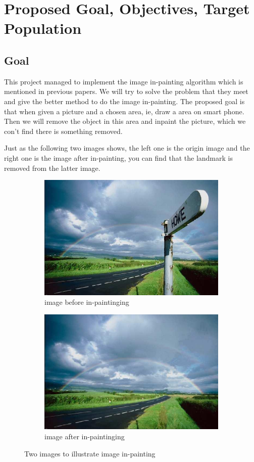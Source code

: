 \documentclass[12pt]{article}
\begin{document}
\section{Proposed Goal, Objectives, Target Population}
\subsection{Goal}
\qquad This project managed to implement the image in-painting algorithm which is mentioned in previous papers. We will try to solve the problem that they meet and give the better method to do the image in-painting. The proposed goal is that when given a picture and a chosen area, ie, draw a area on smart phone. Then we will remove the object in this area and inpaint the picture, which we con't find there is something removed.

\qquad Just as the following two images shows, the left one is the origin image and the right one is the image after in-painting, you can find that the landmark is removed from the latter image.

\begin{figure}[H]
	\begin{subfigure}[pos]{.5\textwidth}
		\centering
		\includegraphics*[width=0.8\linewidth]{1.jpg}
		\caption{image before in-paintinging}
	\end{subfigure}%
	\begin{subfigure}[pos]{.5\textwidth}
		\centering
		\includegraphics*[width=0.8\linewidth]{2.jpg}
		\caption{image after in-paintinging}
	\end{subfigure}%
	\caption{Two images to illustrate image in-painting}
\end{figure}
 
\end{document}
